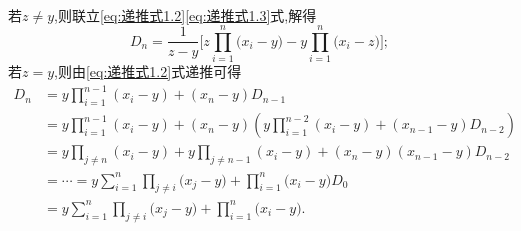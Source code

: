 \documentclass[../../main.tex]{subfiles}
\begin{document}
\begin{solution}
\begin{align}
\label{eq:递推式1.3}
\end{align}
若$z\ne y$,则联立\eqref{eq:递推式1.2}\eqref{eq:递推式1.3}式,解得
\begin{equation}
D_n=\frac{1}{z-y}\biggl[ z\prod\limits_{i=1}^n{(x_i}-y)-y\prod\limits_{i=1}^n{(x_i}-z) \biggr];
\nonumber
\end{equation}
若$z= y$,则由\eqref{eq:递推式1.2}式递推可得
\begin{equation}
\begin{split}
D_n&=y\prod\limits_{i=1}^{n-1}{\left( x_i-y \right)}+\left( x_n-y \right) D_{n-1}
\\
&=y\prod\limits_{i=1}^{n-1}{\left( x_i-y \right)}+\left( x_n-y \right) \left( y\prod\limits_{i=1}^{n-2}{\left( x_i-y \right)}+\left( x_{n-1}-y \right) D_{n-2} \right) 
\\
&=y\prod\limits_{j\ne n}^{}{\left( x_i-y \right)}+y\prod\limits_{j\ne n-1}^{}{\left( x_i-y \right)}+\left( x_n-y \right) \left( x_{n-1}-y \right) D_{n-2}
\\
&=\cdots =y\sum_{i=1}^n{\prod\limits_{j\ne i}{(x_j}}-y)+\prod\limits_{i=1}^n{(x_i}-y)D_0
\\
&=y\sum_{i=1}^n{\prod\limits_{j\ne i}{(x_j}}-y)+\prod\limits_{i=1}^n{(x_i}-y).
\end{split}
\nonumber
\end{equation}


\end{solution}
\end{document}
